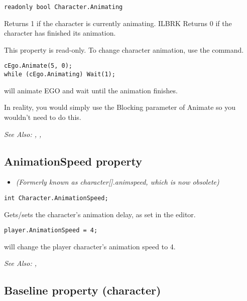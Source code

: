 \begin{verbatim}
readonly bool Character.Animating
\end{verbatim}
Returns 1 if the character is currently animating. ILBRK
Returns 0 if the character has finished its animation.

This property is read-only. To change character animation, use the
 command.

\begin{verbatim}
cEgo.Animate(5, 0);
while (cEgo.Animating) Wait(1);
\end{verbatim}
will animate EGO and wait until the animation finishes.

In reality, you would simply use the Blocking parameter of Animate so you wouldn't need
to do this.

\it{See Also:} ,
,


\subsection{AnimationSpeed property}\label{Character.AnimationSpeed}%

\begin{itemize}
\item \it{(Formerly known as character[].animspeed, which is now obsolete)}
\end{itemize}

\begin{verbatim}
int Character.AnimationSpeed;
\end{verbatim}

Gets/sets the character's animation delay, as set in the editor.

\begin{verbatim}
player.AnimationSpeed = 4;
\end{verbatim}
will change the player character's animation speed to 4.

\it{See Also:} ,


\subsection{Baseline property (character)}\label{Character.Baseline}%

